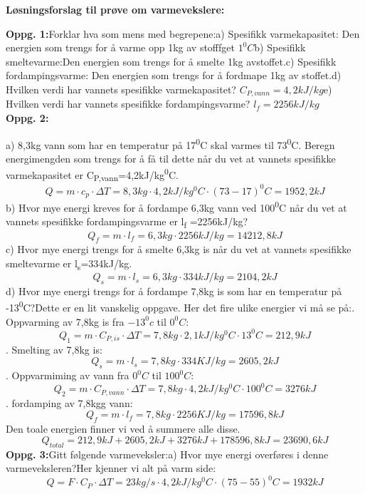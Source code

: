 \documentclass{minmal}
\begin{document}
\begin{center}
\textbf{Løsningsforslag til prøve om varmevekslere:}
\end{center}
\textbf{Oppg. 1:}\nl[1]
\noindent Forklar hva som mens med begrepene:\nl[1]
a) Spesifikk varmekapasitet: Den energien som trengs for å varme opp 1kg av stofffget $1^0C$\nl[1]
b) Spesifikk smeltevarme:Den energien som trengs for å smelte 1kg avstoffet.\nl[1]
c) Spesifikk fordampingsvarme: Den energien som trengs for å fordmape 1kg av stoffet.\nl[1]
d) Hvilken verdi har vannets spesifikke varmekapasitet?  $C_{P,vann}=4,2kJ/kg$\nl[1]
e) Hvilken verdi har vannets spesifikke fordampingsvarme? $l_f=2256kJ/kg$ \nl[2]
\\
\textbf{Oppg. 2:}

\noindent a) 8,3kg vann som har en temperatur på 17\textsuperscript{0}C skal varmes til 73\textsuperscript{0}C. Beregn energimengden som trengs for å få til dette når du vet at vannets spesifikke varmekapasitet er C\textsubscript{P,vann}=4,2kJ/kg\textsuperscript{0}C. \nl[1]
\[Q=m\cdot c_p\cdot \Delta T=8,3kg\cdot 4,2kJ/kg^0C\cdot (73-17)^0C=1952,2kJ\]\nl[1]
b) Hvor mye energi kreves for å fordampe 6,3kg vann ved 100\textsuperscript{0}C når du vet at vannets spesifikke fordampingsvarme er l\textsubscript{f} =2256kJ/kg? \nl[1]
\[Q_f=m\cdot l_f=6,3kg\cdot 2256kJ/kg=14212,8kJ \]
c) Hvor mye energi trengs for å smelte 6,3kg is når du vet at vannets spesifikke smeltevarme er l\textsubscript{s}=334kJ/kg.\nl[1]
\[Q_s=m\cdot l_s=6,3kg\cdot 334kJ/kg=2104,2kJ \]
d) Hvor mye energi trengs for å fordampe 7,8kg is som har en temperatur på -13\textsuperscript{0}C?\nl[1]
Dette er en lit vanskelig oppgave. Her det fire ulike energier vi må se på:. Oppvarming av 7,8kg is fra $-13^0c$ til $0^0C$:
\[Q_1=m\cdot C_{P,is}\cdot \Delta T= 7,8kg\cdot 2,1kJ/kg^0C\cdot 13^0C=212,9kJ\]. Smelting av 7,8kg is:
\[Q_s=m\cdot l_s=7,8kg\cdot 334KJ/kg=2605,2kJ\]. Oppvarmiming av vann fra $0^0C$ til $100^0C$:\nl[1]
\[Q_2=m\cdot C_{P,vann}\cdot \Delta T=7,8kg\cdot 4,2kJ/kg^0C\cdot 100^0C=3276kJ\]. fordamping av 7,8kgg vann:\nl[1]
\[Q_f=m\cdot l_f=7,8kg\cdot 2256KJ/kg=17596,8kJ\]\nl[1]
Den toale energien finner vi ved å  summere alle disse. \nl[1]
\[Q_{total}=212,9kJ+2605,2kJ+3276kJ+178596,8kJ=23690,6kJ\]
\newpage
\noindent\textbf{Oppg. 3:}\nl[1]
Gitt følgende varmeveksler:\nl[1]
\nl[1]
a) Hvor mye energi overføres i denne varmeveksleren?\nl[1]
Her kjenner vi alt på varm side:\nl[1]
\[Q=F\cdot C_P\cdot \Delta T=23kg/s\cdot 4,2kJ/kg^0C\cdot (75-55)^0C=1932kJ\]
\newpage
\end{document}

